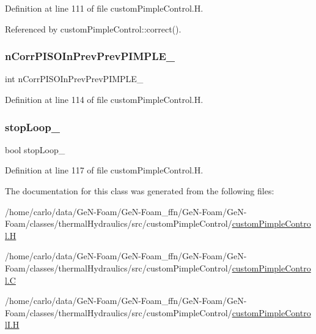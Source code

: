 Definition at line 111 of file custom\+Pimple\+Control.\+H.



Referenced by custom\+Pimple\+Control\+::correct().

\mbox{\label{classFoam_1_1customPimpleControl_a2d598ae5a0cfe7e03ceca9f5b8531026}} 
\subsubsection{\texorpdfstring{n\+Corr\+P\+I\+S\+O\+In\+Prev\+Prev\+P\+I\+M\+P\+L\+E\+\_\+}{nCorrPISOInPrevPrevPIMPLE\_}}
{\footnotesize\ttfamily int n\+Corr\+P\+I\+S\+O\+In\+Prev\+Prev\+P\+I\+M\+P\+L\+E\+\_\+\hspace{0.3cm}{\ttfamily [protected]}}



Definition at line 114 of file custom\+Pimple\+Control.\+H.

\mbox{\label{classFoam_1_1customPimpleControl_af4b358156f2ef3f142c5eaf1e4436e50}} 
\subsubsection{\texorpdfstring{stop\+Loop\+\_\+}{stopLoop\_}}
{\footnotesize\ttfamily bool stop\+Loop\+\_\+\hspace{0.3cm}{\ttfamily [protected]}}



Definition at line 117 of file custom\+Pimple\+Control.\+H.



The documentation for this class was generated from the following files\+:\begin{DoxyCompactItemize}
\item 
/home/carlo/data/\+Ge\+N-\/\+Foam/\+Ge\+N-\/\+Foam\+\_\+ffn/\+Ge\+N-\/\+Foam/\+Ge\+N-\/\+Foam/classes/thermal\+Hydraulics/src/custom\+Pimple\+Control/\hyperlink{customPimpleControl_8H}{custom\+Pimple\+Control.\+H}\item 
/home/carlo/data/\+Ge\+N-\/\+Foam/\+Ge\+N-\/\+Foam\+\_\+ffn/\+Ge\+N-\/\+Foam/\+Ge\+N-\/\+Foam/classes/thermal\+Hydraulics/src/custom\+Pimple\+Control/\hyperlink{customPimpleControl_8C}{custom\+Pimple\+Control.\+C}\item 
/home/carlo/data/\+Ge\+N-\/\+Foam/\+Ge\+N-\/\+Foam\+\_\+ffn/\+Ge\+N-\/\+Foam/\+Ge\+N-\/\+Foam/classes/thermal\+Hydraulics/src/custom\+Pimple\+Control/\hyperlink{customPimpleControlI_8H}{custom\+Pimple\+Control\+I.\+H}\end{DoxyCompactItemize}
